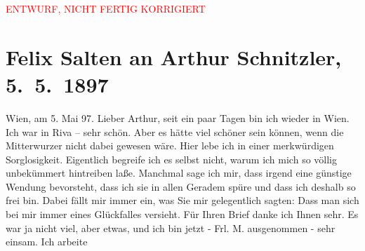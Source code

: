 
\begin{center}
            \textcolor{red}{ENTWURF, NICHT FERTIG KORRIGIERT}
                      \end{center}
            
         
         \renewcommand{\erwaehntePersonen}{Personen: Richard Beer-Hofmann, Otto Brahm, Julius von Gans-Ludassy, Georg Hirschfeld, Hugo von Hofmannsthal, Wilhelmine Mitterwurzer, Ottilie Salten, Gustav Schwarzkopf}
         \renewcommand{\erwaehnteOrte}{Orte: Riva del Garda, Wien}
         \renewcommand{\erwaehnteWerke}{Werke: Agnes Jordan. Schauspiel in fünf Akten}
               \section[Felix Salten an Arthur Schnitzler, 5. 5. 1897]{ Felix Salten an Arthur Schnitzler, 5. 5. 1897}\nopagebreak{}\rehead{ }\begin{ledgroupsized}[t]{13cm}\normalsize\beginnumbering \toendnotes[C]{\smallbreak\pagebreak[2]} 
\toendnotes[C]{\smallbreak}\pstart
           \raggedleft{}{\pb}Wien, am 5. Mai 97. \pend
           \pstart
           Lieber Arthur, seit ein paar Tagen bin ich wieder in Wien. Ich war in Riva – sehr schön. Aber es hätte viel schöner sein können, wenn die Mitterwurzer nicht dabei gewesen wäre. Hier
               lebe ich in einer merkwürdigen Sorglosigkeit. Eigentlich begreife ich es selbst
               nicht, warum ich mich so völlig unbekümmert hintreiben laße. Manchmal sage ich mir,
               dass irgend eine günstige Wendung bevorsteht, dass ich sie in allen Geradem spüre und
               dass ich deshalb so frei bin. Dabei fällt mir immer ein, was Sie mir gelegentlich
               sagten: Dass man sich bei mir immer eines Glückfalles versieht. Für Ihren Brief danke
               ich Ihnen sehr. Es war ja nicht viel, aber etwas, und ich bin jetzt - Frl. M. ausgenommen - sehr einsam. Ich arbeite

\end{ledgroupsized}
